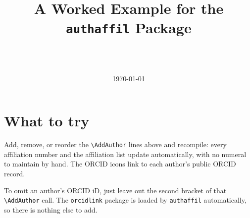 \documentclass[11pt]{article}
\begin{document}
\title{\textbf{A Worked Example for the \texttt{authaffil} Package}}
\author{{\small\begin{center}
    \PrintAuthors      \\[2mm]
    \PrintAffiliations \\[1mm]
    \PrintAffilNotes
\end{center}}}
\date{\today}
\maketitle
\thispagestyle{empty}

\section*{What to try}
Add, remove, or reorder the \texttt{\textbackslash AddAuthor} lines above and
recompile: every affiliation number and the affiliation list update
automatically, with no numeral to maintain by hand. The ORCID icons link to
each author's public ORCID record.

To omit an author's ORCID iD, just leave out the second bracket of that
\texttt{\textbackslash AddAuthor} call. The \texttt{orcidlink} package is
loaded by \texttt{authaffil} automatically, so there is nothing else to add.
\end{document}
